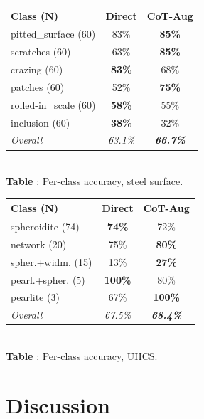 \documentclass{bmvc2k}
\begin{document}
\begin{table}[t]
\begin{minipage}[t]{0.46\textwidth}
\centering
\vspace{0pt}
\label{tab:steel_perclass}
\begin{tabular}{lcc}
\toprule
Class (N) & Direct & CoT-Aug \\
\midrule
pitted\_surface (60) & 83\% & \textbf{85\%} \\
scratches (60) & 63\% & \textbf{85\%} \\
crazing (60) & \textbf{83\%} & 68\% \\
patches (60) & 52\% & \textbf{75\%} \\
rolled-in\_scale (60) & \textbf{58\%} & 55\% \\
inclusion (60) & \textbf{38\%} & 32\% \\
\midrule
\textit{Overall} & \textit{63.1\%} & \textit{\textbf{66.7\%}} \\
\bottomrule
\end{tabular}\\[4pt]
{\small\textcolor{bmv@captioncolor}{\textbf{Table }: Per-class accuracy, steel surface.}}
\end{minipage}%
\hfill
\begin{minipage}[t]{0.46\textwidth}
\centering
\vspace{0pt}
\label{tab:uhcs_perclass}
\begin{tabular}{lcc}
\toprule
Class (N) & Direct & CoT-Aug \\
\midrule
spheroidite (74) & \textbf{74\%} & 72\% \\
network (20) & 75\% & \textbf{80\%} \\
spher.+widm. (15) & 13\% & \textbf{27\%} \\
pearl.+spher. (5) & \textbf{100\%} & 80\% \\
pearlite (3) & 67\% & \textbf{100\%} \\
\midrule
\textit{Overall} & \textit{67.5\%} & \textit{\textbf{68.4\%}} \\
\bottomrule
\end{tabular}\\[4pt]
{\small\textcolor{bmv@captioncolor}{\textbf{Table }: Per-class accuracy, UHCS.}}
\end{minipage}
\end{table}


\section{Discussion}
\label{sec:discussion}
\end{document}
